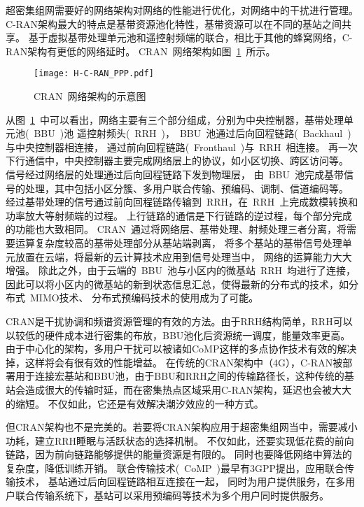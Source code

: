超密集组网需要好的网络架构对网络的性能进行优化，对网络中的干扰进行管理。
C-RAN架构最大的特点是基带资源池化特性，基带资源可以在不同的基站之间共享。
基于虚拟基带处理单元池和遥控射频端的联合，相比于其他的蜂窝网络，C-RAN架构有更低的网络延时。
CRAN~网络架构如图~\ref{CRAN}~所示。
\begin{figure}[htbp]
\centering
\texttt{[image: H-C-RAN\_PPP.pdf]}
\caption{CRAN~网络架构的示意图}\vspace{-1.5em}
\label{CRAN}
\end{figure}
从图~\ref{CRAN}~中可以看出，网络主要有三个部分组成，分别为中央控制器，基带处理单元池(~BBU~)池
遥控射频头(~RRH~)，~BBU~池通过后向回程链路(~Backhaul~)与中央控制器相连接，
通过前向回程链路(~Fronthaul~)与~RRH~相连接。
再一次下行通信中，中央控制器主要完成网络层上的协议，如小区切换、跨区访问等。
信号经过网络层的处理通过后向回程链路下发到物理层，
由~BBU~池完成基带信号的处理，其中包括小区分簇、多用户联合传输、预编码、调制、信道编码等。
经过基带处理的信号通过前向回程链路传输到~RRH，在~RRH~上完成数模转换和功率放大等射频端的过程。
上行链路的通信是下行链路的逆过程，每个部分完成的功能也大致相同。
CRAN~通过将网络层、基带处理、射频处理三者分离，将需要运算复杂度较高的基带处理部分从基站端剥离，
将多个基站的基带信号处理单元放置在云端，将最新的云计算技术应用到信号处理当中，
网络的运算能力大大增强。
除此之外，由于云端的~BBU~池与小区内的微基站~RRH~均进行了连接，
因此可以将小区内的微基站的新到状态信息汇总，使得最新的分布式的技术，如分布式~MIMO技术、
分布式预编码技术的使用成为了可能。

CRAN是干扰协调和频谱资源管理的有效的方法。由于RRH结构简单，RRH可以以较低的硬件成本进行密集的布放，BBU池化后资源统一调度，能量效率更高。
由于中心化的架构，多用户干扰可以被诸如CoMP这样的多点协作技术有效的解决掉，这样将会有很有效的性能增益。
在传统的CRAN架构中（4G），C-RAN被部署用于连接宏基站和BBU池，由于BBU和RRH之间的传输路径长，这种传统的基站会造成很大的传输时延，而在密集热点区域采用C-RAN架构，延迟也会被大大的缩短。
不仅如此，它还是有效解决潮汐效应的一种方式。

但CRAN架构也不是完美的。若要将CRAN架构应用于超密集组网当中，需要减小功耗，建立RRH睡眠与活跃状态的选择机制。
不仅如此，还要实现低花费的前向链路，因为前向链路能够提供的能量资源是有限的。
同时也要降低网络中算法的复杂度，降低训练开销。
联合传输技术(~CoMP~)最早有3GPP提出，应用联合传输技术，
基站通过后向回程链路相互连接在一起，
同时为用户提供服务，在多用户联合传输系统下，基站可以采用预编码等技术为多个用户同时提供服务。

